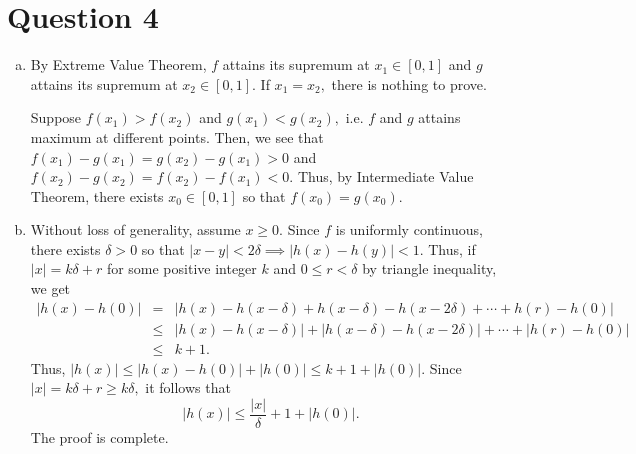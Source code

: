 \documentclass{article}
\begin{document}
\section*{Question 4}
\begin{enumerate}[(a)]
    \item By Extreme Value Theorem, $f$ attains its supremum at $x_1\in[0,1]$ and $g$ attains its supremum at $x_2\in[0,1].$ If $x_1=x_2,$ there is nothing to prove.
    
    Suppose $f(x_1)>f(x_2)$ and $g(x_1)<g(x_2),$ i.e. $f$ and $g$ attains maximum at different points. Then, we see that $f(x_1)-g(x_1)=g(x_2)-g(x_1)>0$ and $f(x_2)-g(x_2)=f(x_2)-f(x_1)<0.$ Thus, by Intermediate Value Theorem, there exists $x_0\in[0,1]$ so that $f(x_0)=g(x_0).$
    \item Without loss of generality, assume $x\geq 0.$ Since $f$ is uniformly continuous, there exists $\delta>0$ so that $|x-y|<2\delta\implies|h(x)-h(y)|<1.$ Thus, if $|x|=k\delta+r$ for some positive integer $k$ and $0\leq r<\delta$ by triangle inequality, we get 
    \begin{eqnarray*}
    |h(x)-h(0)|&=&|h(x)-h(x-\delta)+h(x-\delta)-h(x-2\delta)+\cdots+h(r)-h(0)|\\
    &\leq&|h(x)-h(x-\delta)|+|h(x-\delta)-h(x-2\delta)|+\cdots+|h(r)-h(0)|\\
    &\leq&k+1.
    \end{eqnarray*}
    Thus, $|h(x)|\leq |h(x)-h(0)|+|h(0)|\leq k+1+|h(0)|.$ Since $|x|=k\delta+r\geq k\delta,$ it follows that $$|h(x)|\leq \dfrac{|x|}{\delta}+1+|h(0)|.$$ The proof is complete.
\end{enumerate}
\end{document}
